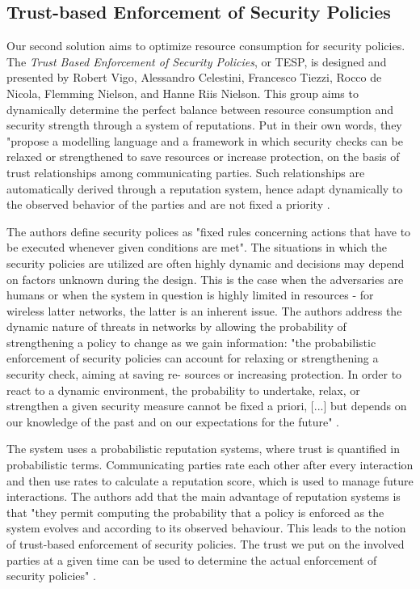 \documentclass[12pt,a4paper,twoside]{report}
\begin{document}
\subsection{Trust-based Enforcement of Security Policies}
Our second solution aims to optimize resource consumption for security policies. The \emph{Trust Based Enforcement of Security Policies}, or TESP, is designed and presented by Robert Vigo, Alessandro Celestini, Francesco Tiezzi, Rocco de Nicola, Flemming Nielson, and Hanne Riis Nielson\cite{vigo;etal:2014}. This group aims to dynamically determine the perfect balance between resource consumption and security strength through a system of reputations. Put in their own words, they "propose a modelling language and a framework in which security checks can be relaxed or strengthened to save resources or increase protection, on the basis of trust relationships among communicating parties. Such relationships are automatically derived through a reputation system, hence adapt dynamically to the observed behavior of the parties and are not fixed a priority \cite{vigo;etal:2014}.\par
The authors define security polices as "fixed rules concerning actions that have to be executed whenever given conditions are met". The situations in which the security policies are utilized are often highly dynamic and decisions may depend on factors unknown during the design. This is the case when the adversaries are humans or when the system in question is highly limited in resources - for wireless latter networks, the latter is an inherent issue. The authors address the dynamic nature of threats in networks by allowing the probability of strengthening a policy to change as we gain information: "the probabilistic enforcement of security policies can account for relaxing or strengthening a security check, aiming at saving re- sources or increasing protection. In order to react to a dynamic environment, the probability to undertake, relax, or strengthen a given security measure cannot be fixed a priori, [...] but depends on our knowledge of the past and on our expectations for the future" \cite{vigo;etal:2014}.\par
The system uses a probabilistic reputation systems, where trust is quantified in probabilistic terms. Communicating parties rate each other after every interaction and then use rates to calculate a reputation score, which is used to manage future interactions. The authors add that the main advantage of reputation systems is that "they permit computing the probability that a policy is enforced as the system evolves and according to its observed behaviour. This leads to the notion of trust-based enforcement of security policies. The trust we put on the involved parties at a given time can be used to determine the actual enforcement of security policies" \cite{vigo;etal:2014}.\par
\end{document}
